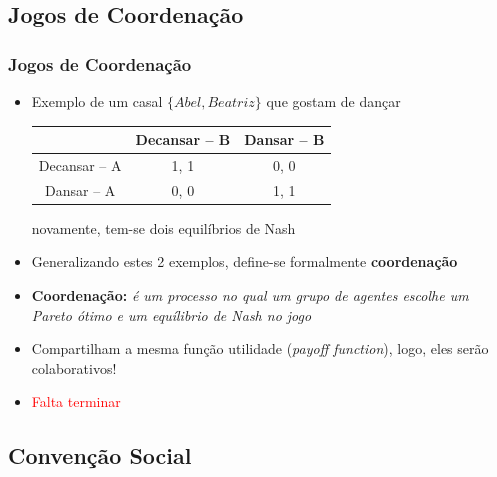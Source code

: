 

\subsection{Jogos de Coordenação}

\begin{frame}
\frametitle{Jogos de Coordenação}

\begin{itemize}
  \item Exemplo de um casal $\{Abel, Beatriz\}$ que gostam de dançar
    \begin{center}
      \begin{tabular}{c || c | c}
                 & Decansar -- B & Dansar -- B \\ \hline  \hline
      Decansar -- A   & 1, 1     &  0, 0      \\ \hline
      Dansar -- A     & 0, 0     &  1, 1         \\ \hline
      \end{tabular}
    \end{center}

novamente, tem-se dois equilíbrios de Nash

\item Generalizando estes 2 exemplos, define-se formalmente
 \textbf{coordenação}
 
 \item \textbf{Coordenação:} \textit{é um processo no qual  um grupo de agentes escolhe um Pareto ótimo e um equílibrio de Nash no jogo}
 
 \item Compartilham a mesma função utilidade
  (\textit{payoff function}), logo, eles  serão
  colaborativos!
 
  \item \textcolor{red}{Falta terminar}
 
\end{itemize}
\end{frame}


\subsection{Convenção Social}


